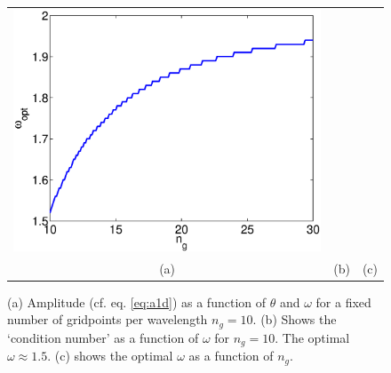\documentclass{article}
\begin{document}
\begin{figure}
\begin{tabular}{ccc}
\includegraphics[scale=.2]{wopt}\\
{\small (a)}&{\small (b)}&{\small (c)}\\
\end{tabular}
\label{fig:error}
\caption{(a) Amplitude (cf. eq. \ref{eq:a1d}) as a function of $\theta$ and $\omega$ for a fixed number of gridpoints
per wavelength $n_g=10$. (b) Shows the `condition number' as a function of $\omega$ for $n_g=10$. The optimal $\omega \approx 1.5$.  (c) shows the optimal $\omega$ as a function of $n_g$.}
\end{figure}
\end{document}
